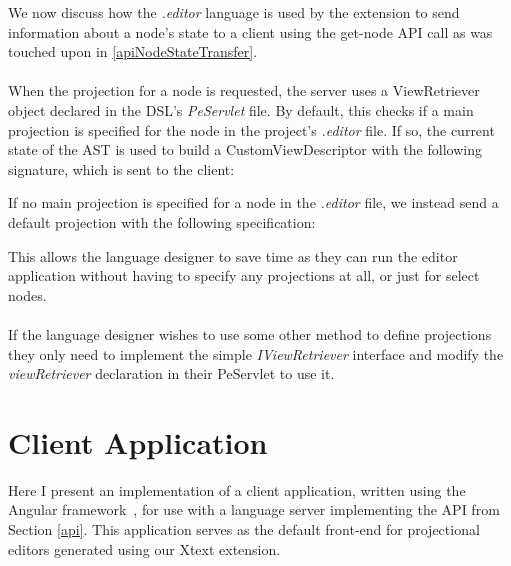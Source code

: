 \documentclass{article}
\begin{document}
{We now discuss how the \emph{.editor} language is used by the extension to send information about a node's state to a client using the get-node API call as was touched upon in \ref{apiNodeStateTransfer}. 
\\
\\
When the projection for a node is requested, the server uses a ViewRetriever object declared in the DSL's \emph{PeServlet} file. By default, this checks if a main projection is specified for the node in the project's \emph{.editor} file. If so, the current state of the AST is used to build a CustomViewDescriptor with the following signature, which is sent to the client: 

\vspace*{0.1cm}
If no main projection is specified for a node in the \emph{.editor} file, we instead send a default projection with the following specification: 

This allows the language designer to save time as they can run the editor application without having to specify any projections at all, or just for select nodes. 
\\
\\
If the language designer wishes to use some other method to define projections they only need to implement the simple \emph{IViewRetriever} interface and modify the \emph{viewRetriever} declaration in their PeServlet to use it.


\section{Client Application}\label{clientApp}
Here I present an implementation of a client application, written using the Angular framework~\cite{angular}, for use with a language server implementing the API from Section \ref{api}. This application serves as the default front-end for projectional editors generated using our Xtext extension. 

}
\end{document}
